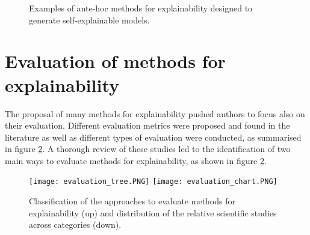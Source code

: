 \documentclass[final,1p,times]{elsarticle}
\begin{document}
\begin{figure}[!ht]
\begin{minipage}{\textwidth}
\centering
  \begin{subfigure}[b]{.28\linewidth}
  \centering
  \newline
  \end{subfigure}
    \begin{subfigure}[b]{.33\linewidth}
  \centering
   \newline
  \end{subfigure}
  \begin{subfigure}[b]{.31\linewidth}
  \centering
  \newline
  \end{subfigure}
  \caption{Examples of ante-hoc methods for explainability designed to generate self-explainable models.}
  \label{fig:self_explainable}
\end{minipage}
\end{figure}




\section{Evaluation of methods for explainability}\label{xaievaluation}
The proposal of many methods for explainability pushed authors to focus also on their evaluation. Different evaluation metrics were proposed and found in the literature as well as different types of evaluation were conducted, as summarised in figure \ref{fig:evaluation_tree}.
A thorough review of these studies led to the identification of two main ways to evaluate methods for explainability, as shown in figure \ref{fig:evaluation_tree}.

\begin{figure}[!ht]
\centering
  \texttt{[image: evaluation\_tree.PNG]}
  \newline
  \texttt{[image: evaluation\_chart.PNG]}
  \caption{Classification of the approaches to evaluate methods for explainability (up) and distribution of the relative scientific studies across categories (down).}
  \label{fig:evaluation_tree}
\end{figure}
 
\end{document}

